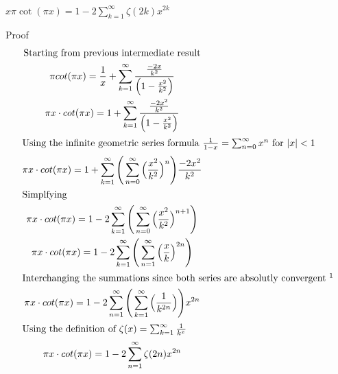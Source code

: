 \documentclass[a4paper]{article}
\begin{document}
\begin{theorem} \label{cot series zeta}
$\boxed{x \pi \cot(\pi x) = 1 - 2 \sum_{k=1}^{\infty} \zeta(2k) x^{2k}
}$

Proof\\
\begin{gather*}
\text{Starting from previous intermediate result}
\\
\pi cot(\pi x) = \frac{1}{x} + \sum_{k=1}^{\infty} \frac{\frac{-2x}{k^2}}{\Big( 1-\frac{x^2}{k^2} \Big)} 
\\
\pi x \cdot cot(\pi x) = 1 + \sum_{k=1}^{\infty} \frac{\frac{-2x^2}{k^2}}{\Big( 1-\frac{x^2}{k^2} \Big)} 
\\
\intertext{Using the infinite geometric series formula $\frac{1}{1-x} = \sum_{n=0}^{\infty} x^n $ for $|x| < 1$}
\pi x \cdot cot(\pi x) = 1 + \sum_{k=1}^{\infty} \Bigg( \sum_{n=0}^{\infty} \Big( \frac{x^2}{k^2} \Big)^n \Bigg) \frac{-2x^2}{k^2}  
\\
\intertext{Simplfying}
\pi x \cdot cot(\pi x) = 1 - 2 \sum_{k=1}^{\infty} \Bigg( \sum_{n=0}^{\infty} \Big( \frac{x^2}{k^2} \Big)^{n+1} \Bigg)
\\
\pi x \cdot cot(\pi x) = 1 - 2 \sum_{k=1}^{\infty} \Bigg( \sum_{n=1}^{\infty} \Big( \frac{x}{k} \Big)^{2n} \Bigg)
\\
\intertext{Interchanging the summations since both series are absolutly convergent \footnotemark}
\pi x \cdot cot(\pi x) = 1 - 2 \sum_{n=1}^{\infty} \Bigg( \sum_{k=1}^{\infty} \Big( \frac{1}{k^{2n}} \Big) \Bigg) x^{2n}
\\
\intertext{Using the definition of $\zeta(x) = \sum_{k=1}^{\infty} \frac{1}{k^x}$}
\pi x \cdot cot(\pi x) = 1 - 2 \sum_{n=1}^{\infty} \zeta(2n) x^{2n}
\end{gather*}
\end{theorem}

\end{document}
